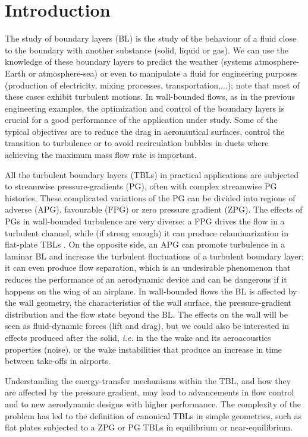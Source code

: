 \section{Introduction} \label{sec:Introduction}
The study of boundary layers (BL) is the study of the behaviour of a fluid close to the boundary with another substance (solid, liquid or gas). We can use the knowledge of these boundary layers to predict the weather (systems atmosphere-Earth or atmosphere-sea) or even to manipulate a fluid for engineering purposes (production of electricity, mixing processes, transportation,...); note that most of these cases exhibit turbulent motions. In wall-bounded flows, as in the previous engineering examples, the optimization and control of the boundary layers is crucial for a good performance of the application under study. Some of the typical objectives are to reduce the drag in aeronautical surfaces, control the transition to turbulence or to avoid recirculation bubbles in ducts where achieving the maximum mass flow rate is important.

All the turbulent boundary layers (TBLs) in practical applications are subjected to streamwise pressure-gradients (PG), often with complex streamwise PG histories. These complicated variations of the PG can be divided into regions of adverse (APG), favourable (FPG) or zero pressure gradient (ZPG). The effects of PGs in wall-bounded turbulence are very diverse: a FPG drives the flow in a turbulent channel, while (if strong enough) it can produce relaminarization in flat-plate TBLs \citep{narasimha_sreenivasan_1973, FPG_araya2015}. On the opposite side, an APG can promote turbulence in a laminar BL and increase the turbulent fluctuations of a turbulent boundary layer; it can even produce flow separation, which is an undesirable phenomenon that reduces the performance of an aerodynamic device and can be dangerous if it happens on the wing of an airplane.
In wall-bounded flows the BL is affected by the wall geometry, the characteristics of the wall surface, the pressure-gradient distribution and the flow state beyond the BL. The effects on the wall will be seen as fluid-dynamic forces (lift and drag), but we could also be interested in effects produced after the solid, {\it i.e.} in the  the wake and its aeroacoustics properties (noise), or the wake instabilities that produce an increase in time between take-offs in airports.

Understanding the energy-transfer mechanisms within the TBL, and how they are affected by the pressure gradient, may lead to advancements in flow control and to new aerodynamic designs with higher performance.
The complexity of the problem has led to the definition of canonical TBLs in simple geometries, such as flat plates subjected to a ZPG or PG TBLs in equilibrium or near-equilibrium. 

